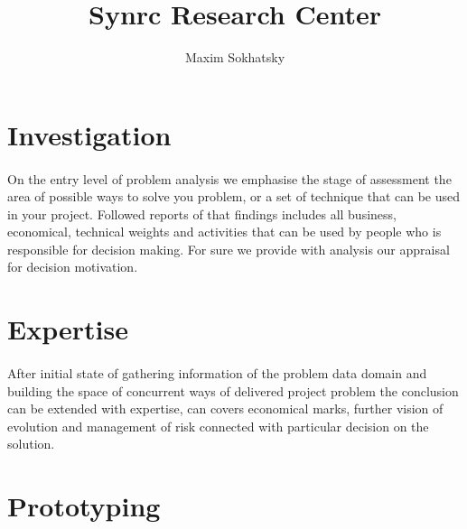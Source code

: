\documentclass[11pt]{article}
\begin{document}

\title{Synrc Research Center}
\author{Maxim Sokhatsky}

\section*{Investigation}
\paragraph{}
    On the entry level of problem analysis we emphasise the stage of
    assessment the area of possible ways to solve you problem, or a
    set of technique that can be used in your project. Followed reports
    of that findings includes all business, economical, technical weights
    and activities that can be used by people who is responsible for
    decision making. For sure we provide with analysis our appraisal
    for decision motivation.
\section*{Expertise}
\paragraph{}
After initial state of gathering information of the problem data domain
    and building the space of concurrent ways of delivered project problem
    the conclusion can be extended with expertise, can covers economical
    marks, further vision of evolution and management of risk connected
    with particular decision on the solution.
\section*{Prototyping}
\end{document}
